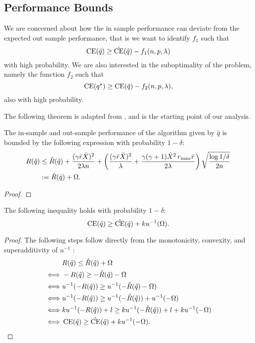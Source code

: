 \documentclass[10pt]{article}
\begin{document}
\subsection{Performance Bounds}

We are concerned about how the in sample performance can deviate from the expected out sample
performance, that is we want to identify $f_1$ such that
\[
  \operatorname{CE}(\hat q) \geq \hat{\operatorname{CE}}(\hat q) - f_1(n,p,\lambda)
\]
with high probability. We are also interested in the suboptimality of the problem, namely
the function $f_2$ such that
\[
  \operatorname{CE}(q^\star) \geq \operatorname{CE}(\hat q) - f_2(n,p,\lambda),
\]
also with high probability. 

The following theorem is adapted from \cite{bousquet2002stability}, and is the starting point of our
analysis. 

\begin{thm}
  \label{thm1}
  The in-sample and out-sample performance of the algorithm given by $\hat q$ is bounded
  by the following expression with probability $1-\delta$:
  \begin{align*}
    R(\hat q) &\leq \hat R(\hat q) + \frac{(\gamma\bar r\bar X)^2}{2\lambda n} +
    \left(\frac{(\gamma\bar r\bar X)^2}{\lambda} + \frac{\gamma(\gamma+1)\bar X^2\,r_{\max}\bar
    r}{2\lambda}\right)\sqrt{\frac{\log 1/\delta}{2n}}\\
              &:= \hat R(\hat q) + \Omega.
  \end{align*}
\end{thm}

\begin{proof}
\end{proof}

\begin{thm}
  \label{thm2}
  The following inequality holds with probability $1-\delta$:
  \[
    \operatorname{CE}(\hat q) \geq \hat{\operatorname{CE}}(\hat q) + ku^{-1}(\Omega).
  \]
\end{thm}

\begin{proof}
  The following steps follow directly from the monotonicity, convexity, and
  superadditivity of $u^{-1}$ :
  \begin{align*}
    & R(\hat q) \leq \hat R(\hat q) + \Omega\\
    \iff & -R(\hat q) \geq -\hat R(\hat q) - \Omega\\
    \iff & u^{-1}(-R(\hat q)) \geq u^{-1}(-\hat R(\hat q) - \Omega)\\
    \iff & u^{-1}(-R(\hat q)) \geq u^{-1}(-\hat R(\hat q)) + u^{-1}(-\Omega)\\
    \iff & ku^{-1}(-R(\hat q))+l \geq ku^{-1}(-\hat R(\hat q))+l + ku^{-1}(-\Omega)\\
    \iff & \operatorname{CE}(\hat q) \geq \hat{\operatorname{CE}}(\hat q) + ku^{-1}(-\Omega).\qedhere
  \end{align*}
\end{proof}
\end{document}
